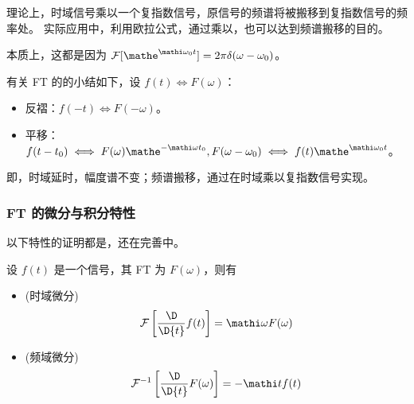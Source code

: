 \begin{remark}
    理论上，时域信号乘以一个复指数信号，原信号的频谱将被搬移到复指数信号的频率处。
    实际应用中，利用欧拉公式，通过乘以，也可以达到频谱搬移的目的。

    本质上，这都是因为 $\mathcal{F}[\mathe^{\mathi \omega_0 t}] = 2\pi\delta(\omega - \omega_0)$。
\end{remark}

\begin{note}
    有关 FT 的的小结如下，设 $f(t) \iff F(\omega)$：
    \begin{itemize}
        \item 反褶：$f(-t) \iff F(-\omega)$。
        \item 平移：$f(t - t_0) \iff F(\omega)\mathe^{-\mathi\omega t_0}, F(\omega - \omega_0) \iff f(t)\mathe^{\mathi\omega_0 t}$。
    \end{itemize}
    即，时域延时，幅度谱不变；频谱搬移，通过在时域乘以复指数信号实现。
\end{note}

\subsubsection{FT 的微分与积分特性}

\begin{note}
    以下特性的证明都是，还在完善中。
\end{note}

\begin{property}[微分特性]
    设 $f(t)$ 是一个信号，其 FT 为 $F(\omega)$，则有
    \begin{itemize}
        \item (时域微分)
            \begin{align*}
                \mathcal{F}\left[\frac{\D}{\D{t}}f(t)\right] = \mathi \omega F(\omega)
            \end{align*}
        \item (频域微分)
            \begin{align*}
                \mathcal{F}^{-1}\left[\frac{\D}{\D{t}}F(\omega)\right] = -\mathi t f(t)
            \end{align*}
    \end{itemize}
\end{property}

